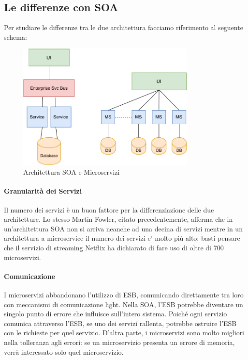 \subsection{Le differenze con SOA}
Per studiare le differenze tra le due architettura facciamo riferimento al seguente schema:
\begin{figure}[H]
    \centering
    \includegraphics[width=0.80\textwidth]{images/01_8_microservices_vs_soa.pdf}
    \caption{Architettura SOA e Microservizi }
    \label{fig:soavsmicroservices}
\end{figure}
\paragraph*{Granularità dei Servizi} Il numero dei servizi è un buon fattore per la differenziazione delle due architetture. Lo stesso Martin Fowler, citato precedentemente, afferma che in un'architettura SOA non si arriva neanche ad una decina di  servizi mentre in un architettura a microservice il numero dei servizi e’ molto più alto: basti pensare che il servizio di streaming Netflix ha dichiarato di fare uso di oltre di 700 microservizi. \cite{article:netflixmicroservices}

\paragraph{Comunicazione} I microservizi abbandonano l’utilizzo di ESB, comunicando direttamente tra loro con meccanismi di comunicazione light. Nella SOA, l’ESB potrebbe diventare un singolo punto di errore che influisce sull’intero sistema. Poiché ogni servizio comunica attraverso l’ESB, se uno dei servizi rallenta, potrebbe ostruire l’ESB con le richieste per quel servizio. D’altra parte, i microservizi sono molto migliori nella tolleranza agli errori: se un microservizio presenta un errore di memoria, verrà interessato solo quel microservizio.

